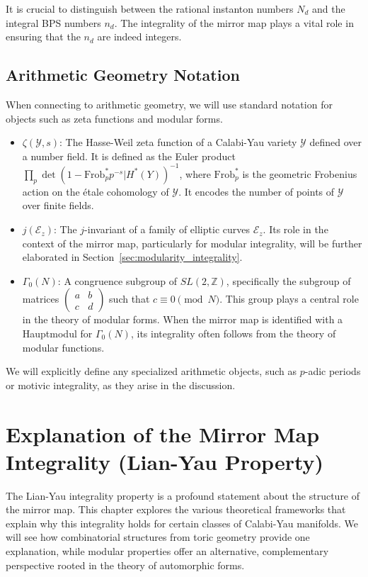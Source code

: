 \documentclass{book}
\newcommand{\calY}{\mathcal{Y}} %
\newcommand{\Nd}{N_d} %
\newcommand{\nd}{n_d} %
\newcommand{\Zeta}{\zeta} %
\newcommand{\jinv}{j} %
\theoremstyle{definition}
\begin{document}
It is crucial to distinguish between the rational instanton numbers $\Nd$ and the integral BPS numbers $\nd$. The integrality of the mirror map plays a vital role in ensuring that the $\nd$ are indeed integers.

\section{Arithmetic Geometry Notation}
When connecting to arithmetic geometry, we will use standard notation for objects such as zeta functions and modular forms.
\begin{itemize}
    \item $\Zeta(\calY, s)$: The Hasse-Weil zeta function of a Calabi-Yau variety $\calY$ defined over a number field. It is defined as the Euler product $\prod_p \det(1 - \text{Frob}_p^* p^{-s} | H^*(Y))^{-1}$, where $\text{Frob}_p^*$ is the geometric Frobenius action on the étale cohomology of $\calY$. It encodes the number of points of $\calY$ over finite fields.
    \item $\jinv(\mathcal{E}_z)$: The $j$-invariant of a family of elliptic curves $\mathcal{E}_z$. Its role in the context of the mirror map, particularly for modular integrality, will be further elaborated in Section~\ref{sec:modularity_integrality}.
    \item $\Gamma_0(N)$: A congruence subgroup of $SL(2, \mathbb{Z})$, specifically the subgroup of matrices $\begin{pmatrix} a & b \\ c & d \end{pmatrix}$ such that $c \equiv 0 \pmod N$. This group plays a central role in the theory of modular forms. When the mirror map is identified with a Hauptmodul for $\Gamma_0(N)$, its integrality often follows from the theory of modular functions.
\end{itemize}
We will explicitly define any specialized arithmetic objects, such as $p$-adic periods or motivic integrality, as they arise in the discussion.

\chapter{Explanation of the Mirror Map Integrality (Lian-Yau Property)}
\label{chap:lian-yau}

The Lian-Yau integrality property is a profound statement about the structure of the mirror map. This chapter explores the various theoretical frameworks that explain why this integrality holds for certain classes of Calabi-Yau manifolds. We will see how combinatorial structures from toric geometry provide one explanation, while modular properties offer an alternative, complementary perspective rooted in the theory of automorphic forms.
\end{document}
